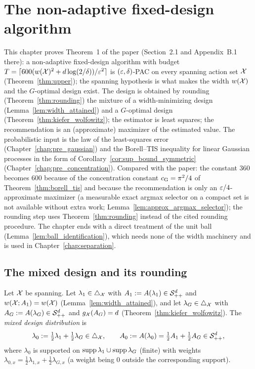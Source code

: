 \chapter{The non-adaptive fixed-design algorithm}
\label{chap:upper}

This chapter proves Theorem~1 of the paper (Section~2.1 and Appendix~B.1 there): a
non-adaptive fixed-design algorithm with budget
$T = \lceil 600(w(\mathcal{X})^2 + d\log(2/\delta))/\varepsilon^2\rceil$ is $(\varepsilon,\delta)$-PAC on every
spanning action set $\mathcal{X}$ (Theorem~\ref{thm:upper}); the spanning hypothesis is what makes the
width $w(\mathcal{X})$ and the $G$-optimal design exist. The design is obtained by rounding
(Theorem~\ref{thm:rounding}) the mixture of a width-minimizing design
(Lemma~\ref{lem:width_attained}) and a $G$-optimal design (Theorem~\ref{thm:kiefer_wolfowitz});
the estimator is least squares; the recommendation is an (approximate) maximizer of the
estimated value. The probabilistic input is the law of the least-squares error
(Chapter~\ref{chap:pre_gaussian}) and the Borell--TIS inequality for linear Gaussian processes in
the form of Corollary~\ref{cor:sup_bound_symmetric} (Chapter~\ref{chap:pre_concentration}).
Compared with the paper: the constant $360$ becomes $600$ because of the concentration
constant $c_{\mathrm{G}} = \pi^2/4$ of Theorem~\ref{thm:borell_tis} and because the recommendation is only
an $\varepsilon/4$-approximate maximizer (a measurable exact argmax selector on a compact set is not
available without extra work; Lemma~\ref{lem:approx_argmax_selector}); the rounding step uses
Theorem~\ref{thm:rounding} instead of the cited rounding procedure. The chapter ends with a
direct treatment of the unit ball (Lemma~\ref{lem:ball_identification}), which needs none of
the width machinery and is used in Chapter~\ref{chap:separation}.

\section{The mixed design and its rounding}
\label{sec:upper_design}

\begin{definition}\label{def:mixed_design}
\leanok
{}
Let $\mathcal{X}$ be spanning. Let $\lambda_1 \in \triangle_{\mathcal{X}}$ with $A_1 := A(\lambda_1) \in \mathcal{S}_{++}^{d}$ and
$w(\mathcal{X};A_1) = w(\mathcal{X})$ (Lemma~\ref{lem:width_attained}), and let $\lambda_G \in \triangle_{\mathcal{X}}$
with $A_G := A(\lambda_G) \in \mathcal{S}_{++}^{d}$ and $g_{\mathcal{X}}(A_G) = d$ (Theorem~\ref{thm:kiefer_wolfowitz}). The
\emph{mixed design distribution} is
\[
  \lambda_0 := \tfrac12\lambda_1 + \tfrac12\lambda_G \in \triangle_{\mathcal{X}},
  \qquad
  A_0 := A(\lambda_0) = \tfrac12A_1 + \tfrac12A_G \in \mathcal{S}_{++}^{d} ,
\]
where $\lambda_0$ is supported on $\operatorname{supp}\lambda_1\cup\operatorname{supp}\lambda_G$ (finite) with weights
$\lambda_{0,x} = \frac12\lambda_{1,x} + \frac12\lambda_{G,x}$ (a weight being $0$ outside the
corresponding support).
\end{definition}


